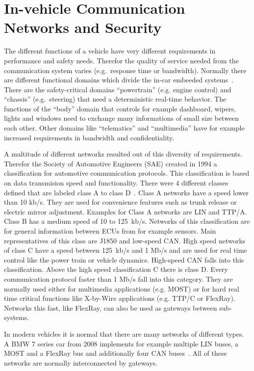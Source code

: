 

\section{In-vehicle Communication Networks and Security}\label{sec:communication-networks}

The different functions of a vehicle have very different requirements in
performance and safety needs. Therefor the quality of service needed from the
communication system varies (e.g.\ response time or bandwidth). Normally there
are different functional domains which divide the in-car embeeded
systems~\cite{Navet2017}. There are the safety-critical domains ``powertrain''
(e.g. engine control) and ``chassis'' (e.g.\ steering) that need a deterministic
real-time behavior. The functions of the ``body'' domain that controls for
example dashboard, wipers, lights and windows need to exchange many informations
of small size between each other. Other domains like ``telematics'' and
``multimedia'' have for example increased requirements in bandwidth and
confidentiality.

A multitude of different networks resulted out of this diversity of
requirements. Therefor the Society of Automotive Engineers (SAE) created in 1994
a classification for automotive communication protocols. This classification is
based on data transmision speed and functionality. There were 4 different
classes defined that are labeled class A to class D~\cite{Ali2017}. Class A
networks have a speed lower than 10 kb/s. They are used for convenience features
such as trunk release or electric mirror adjustment. Examples for Class A
networks are LIN and TTP/A. Class B has a medium speed of 10 to 125~kb/s.
Networks of this classification are for general information between ECUs from
for example sensors. Main representatives of this class are J1850 and low-speed
CAN\@. High speed networks of class C have a speed between 125~kb/s and 1 Mb/s and
are used for real time control like the power train or vehicle dynamics.
High-speed CAN falls into this classification. Above the high speed
classification C there is class D\@. Every communication protocol faster than 1
Mb/s fall into this category. They are normally used either for multimedia
applications (e.g. MOST) or for hard real time critical functions like X-by-Wire
applications (e.g. TTP/C or FlexRay). Networks this fast, like FlexRay, can also
be used as gateways between sub-systems.

In modern vehicles it is normal that there are many networks of different types.
A BMW 7 series car from 2008 implements for example multiple LIN buses, a MOST
and a FlexRay bus and additionally four CAN buses~\cite{Kellermann2008}. All of
these networks are normally interconnected by gateways.

